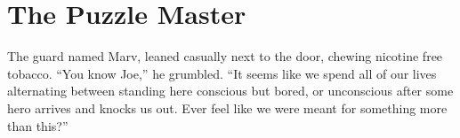 \documentclass[showtrims,b6paper,draft,10pt]{memoir}
\begin{document}
\begin{comment}
The most prominent memorial was the great statue in the middle of the ground of Patrick Smith, the man who lead the First Heroes in overthrowing King George, the infamous last of the kings who had decided that oppressing his subjects was simply more `fun' than serving them.  This, however, was not why he was honored, for many heros had defeated great enemies, but no other had their statue in this ground.  What made Patrick special was that after leading the First Heroes to overthrow the King, in the moment when the people had been willing to crown him their ruler in their stead, he refused the honor and instead created a parliamentary democracy to govern the land.  He and the First Heroes together founded the Order of Heroes, and by his insistence it was deliberately made subservient to the parliament;  on the platform below his statue is carved the calling of the Heroes of the Order:  ``We fight to protect, not to rule.''  His figure is protrayed on one knee, with a sword held high in one hand and a child cradled against him in the other.

If anyone had doubt in the commitment of the Order in carrying out its mission over the last three hundred years, it would be immediately dispelled by the plain stones surrounding the statue -- stones filled with names, hundreds of names, of the heroes who had died in service.  Every time Christina walked past the stones, she would reach out and touch some of the names.  No woman's name appeared on the stones, and in a way she was glad of this;  since she had been the first woman admitted to the order, if a name were to appear on the stones in the near future it would be her own!

She continued quietly on her way to her commander's office, sobered both by the memorial ground and also by thoughts of the briefing she was going to have to give him shortly.

\timeskip


\end{comment}
\chapter{The Puzzle Master}

The guard named Marv, leaned casually next to the door, chewing nicotine free tobacco.  “You know Joe,” he grumbled.  “It seems like we spend all of our lives alternating between standing here conscious but bored, or unconscious after some hero arrives and knocks us out.  Ever feel like we were meant for something more than this?”
\end{document}
